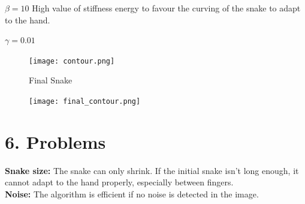 \documentclass{report}
\begin{document}
$ \beta =10 $ High value of stiffness energy to favour the curving of the snake to adapt to the hand.

$ \gamma =0.01 $  

 \begin{figure}[H]
							\begin{center}
							\texttt{[image: contour.png]}
              \caption*{Final Snake}
							\end{center}
\end{figure}

 \begin{figure}[H]
							\begin{center}
							\texttt{[image: final\_contour.png]}
							\end{center}
\end{figure}

\section*{6. Problems}

\textbf{Snake size:} The snake can only shrink. If the initial snake isn't long enough, it cannot adapt to the hand properly, especially between fingers. \\

\textbf{Noise:} The algorithm is efficient if no noise is detected in the image. 
\end{document}
